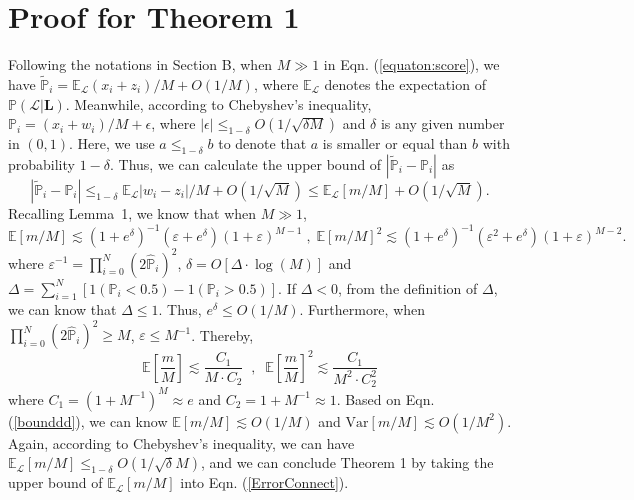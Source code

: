 \documentclass{article}
\begin{document}
\section{Proof for Theorem 1}
Following the notations in Section B, when $M\gg 1$ in Eqn. (\ref{equaton:score}), we have $\tilde{\mathbb{P}}_i=\mathbb{E}_{\mathcal{L}}(x_i+z_i)/M+O(1/M)$, where $\mathbb{E}_{\mathcal{L}}$ denotes the expectation of $\mathbb{P}(\mathcal{L}|\bm{L})$. Meanwhile, according to Chebyshev's inequality, $\mathbb{P}_i= (x_i+w_i)/M+\epsilon$, where $|\epsilon|\leq_{1-\delta}O(1/\sqrt{\delta M})$ and $\delta$ is any given number in $(0,1)$.
Here, we use $a\leq_{1-\delta} b$ to denote that $a$ is smaller or equal than $b$ with probability $1-\delta$.
Thus, we can calculate the upper bound of $|\tilde{\mathbb{P}}_i-\mathbb{P}_i|$ as
\begin{equation}
\label{ErrorConnect}
|\tilde{\mathbb{P}}_i-\mathbb{P}_i|\leq_{1-\delta} \mathbb{E}_{\mathcal{L}}|w_i-z_i|/M +O(1/\sqrt{M}) \leq \mathbb{E}_{\mathcal{L}}\left[m/M\right]+O(1/\sqrt{M}).
\end{equation}
Recalling Lemma~1, we know that when $M\gg 1$,
\begin{equation}
\mathbb{E}[m/M]\lesssim (1+e^{\delta})^{-1}(\varepsilon+e^{\delta})(1+\varepsilon)^{M-1}\;,\;
\mathbb{E}[m/M]^2\lesssim (1+e^{\delta})^{-1}(\varepsilon^2+e^{\delta})(1+\varepsilon)^{M-2}.
\end{equation}
where $\varepsilon^{-1}=\prod_{i=0}^{N}(2\hat{\mathbb{P}}_i)^{2}$, $\delta=O[\Delta\cdot \log(M)]$ and $\Delta={\sum}_{i=1}^N[1(\mathbb{P}_i<0.5)-1(\mathbb{P}_i>0.5)]$.
If $\Delta<0$, from the definition of $\Delta$, we can know that $\Delta\leq 1$. Thus, $e^{\delta}\leq O(1/M)$.
Furthermore, when ${\prod}_{i=0}^{N}(2\hat{\mathbb{P}}_{i})^{2} \geq M$, $\varepsilon\leq M^{-1}$.
Thereby, 
\begin{equation}
\label{bounddd}
\mathbb{E}\left[\frac{m}{M}\right]\lesssim \frac{C_{1}}{M\cdot C_2}\;\;, \;\;\mathbb{E}\left[\frac{m}{M}\right]^2\lesssim \frac{C_{1}}{M^2\cdot C_2^2}
\end{equation}
where $C_{1}=(1+M^{-1})^{M}\approx e$ and $C_{2}=1+M^{-1}\approx 1$.
Based on Eqn. (\ref{bounddd}), we can know $\mathbb{E}[m/M]\lesssim O(1/M)$ and $\mathrm{Var}[m/M]\lesssim O(1/M^2)$.
Again, according to Chebyshev's inequality, we can have $ \mathbb{E}_{\mathcal{L}}\left[m/M\right]\leq_{1-\delta}O(1/\sqrt{\delta}M)$, and we can conclude Theorem 1 by taking the upper bound of $\mathbb{E}_{\mathcal{L}}\left[m/M\right]$ into Eqn. (\ref{ErrorConnect}).
\end{document}
